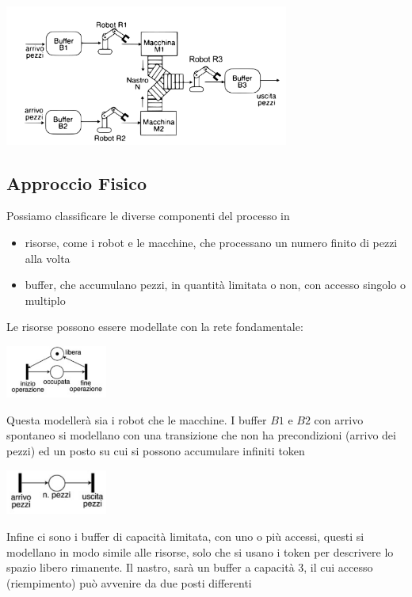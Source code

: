 \documentclass[10pt, letterpaper]{report}
\begin{document}
\begin{center}
    \includegraphics[width=0.7\textwidth]{images/petriModeling.pdf}
\end{center}
\subsection{Approccio Fisico}
Possiamo classificare le diverse componenti del processo in \begin{itemize}
    \item risorse, come i robot e le macchine, che processano un numero finito di pezzi alla volta 
    \item buffer, che accumulano pezzi, in quantità limitata o non, con accesso singolo o multiplo 
\end{itemize}
Le risorse possono essere modellate con la rete fondamentale:
\begin{center}
    \includegraphics[width=0.25\textwidth]{images/risorsaPetri.png}
\end{center}
Questa modellerà sia i robot che le macchine. I buffer $B1$ e $B2$ con arrivo spontaneo si modellano con una transizione che non ha precondizioni (arrivo dei pezzi) ed un posto su cui si possono accumulare infiniti token
\begin{center}
    \includegraphics[width=0.25\textwidth]{images/arrivoPezzi.png}
\end{center}
Infine ci sono i buffer di capacità limitata, con uno o più accessi, questi si modellano in modo simile alle risorse, solo che si usano i token per descrivere lo spazio libero rimanente. Il nastro, sarà un buffer a capacità 3, il cui accesso (riempimento) può avvenire da due posti differenti
\end{document}

